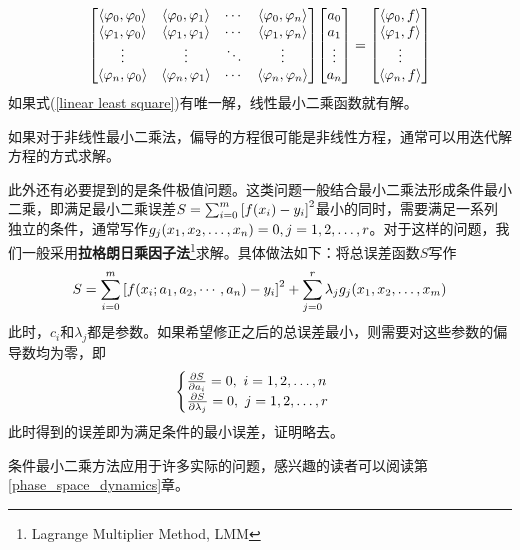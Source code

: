 \documentclass[12pt,a4paper,openany,twoside]{book}
\numberwithin{equation}{section}
\newcommand{\mean}[1]{\left\langle #1 \right\rangle}
\begin{document}
      \begin{equation}
        \mqty[
          \mean{\varphi_0,\varphi_0}&\mean{\varphi_0,\varphi_1}&\cdots&\mean{\varphi_0,\varphi_n}\\
          \mean{\varphi_1,\varphi_0}&\mean{\varphi_1,\varphi_1}&\cdots&\mean{\varphi_1,\varphi_n}\\
          \vdots&\vdots&\ddots&\vdots\\
          \mean{\varphi_n,\varphi_0}&\mean{\varphi_n,\varphi_1}&\cdots&\mean{\varphi_n,\varphi_n}
        ]\mqty[
          a_0\\
          a_1\\
          \vdots\\
          a_n
        ]=\mqty[
          \mean{\varphi_0,f}\\
          \mean{\varphi_1,f}\\
          \vdots\\
          \mean{\varphi_n,f}
        ]
        \label{linear least square}
      \end{equation}
      如果式(\ref{linear least square})有唯一解，线性最小二乘函数就有解。

      如果对于非线性最小二乘法，偏导的方程很可能是非线性方程，通常可以用迭代解方程的方式求解。

      此外还有必要提到的是条件极值问题。这类问题一般结合最小二乘法形成条件最小二乘，即满足最小二乘误差$S=\sum_{i=0}^m{\qty[f\qty(x_i)-y_i]^2}$最小的同时，需要满足一系列独立的条件，通常写作$g_j\qty(x_1,x_2,\dots,x_n)=0,j=1,2,\dots,r$。对于这样的问题，我们一般采用\textbf{拉格朗日乘因子法}\footnote{Lagrange Multiplier Method, LMM}求解。具体做法如下：将总误差函数$S$写作
      \begin{equation}
        S=\sum_{i=0}^m{\qty[f\qty(x_i;a_1,a_2,\cdots,a_n)-y_i]^2}+\sum_{j=0}^r{\lambda_j g_j\qty(x_1,x_2,\dots,x_m)}
      \end{equation}
      此时，$c_i$和$\lambda_j$都是参数。如果希望修正之后的总误差最小，则需要对这些参数的偏导数均为零，即
      \begin{equation}
        \begin{cases}
          \pdv{S}{a_i}=0,\ i=1,2,\dots,n\\
          \pdv{S}{\lambda_j}=0,\ j=1,2,\dots,r
        \end{cases}
      \end{equation}
      此时得到的误差即为满足条件的最小误差，证明略去。

      条件最小二乘方法应用于许多实际的问题，感兴趣的读者可以阅读第\ref{phase_space_dynamics}章。
\end{document}

